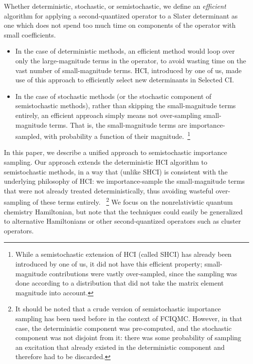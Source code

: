 \documentclass[english]{article}
\begin{document}
Whether deterministic, stochastic, or semistochastic, we define an \emph{efficient} algorithm for applying a second-quantized operator to a Slater determinant as one which does not spend too much time on components of the operator with small coefficients.
\begin{itemize}
\item In the case of deterministic methods, an efficient method would loop over only the large-magnitude terms in the operator, to avoid wasting time on the vast number of small-magnitude terms. HCI, introduced by one of us, made use of this approach to efficiently select new determinants in Selected CI.
\item In the case of stochastic methods (or the stochastic component of semistochastic methods), rather than skipping the small-magnitude terms entirely, an efficient approach simply means not over-sampling small-magnitude terms. That is, the small-magnitude terms are importance-sampled, with probability a function of their magnitude.~\footnote{While a semistochastic extension of HCI (called SHCI) has already been introduced by one of us, it did not have this efficient property; small-magnitude contributions were vastly over-sampled, since the sampling was done according to a distribution that did not take the matrix element magnitude into account.}
\end{itemize}

In this paper, we describe a unified approach to semistochastic importance sampling. Our approach extends the deterministic HCI algorithm to semistochastic methods, in a way that (unlike SHCI) is consistent with the underlying philosophy of HCI: we importance-sample the small-magnitude terms that were not already treated deterministically, thus avoiding wasteful over-sampling of these terms entirely. ~\footnote{It should be noted that a crude version of semistochastic importance sampling has been used before in the context of FCIQMC. However, in that case, the deterministic component was pre-computed, and the stochastic component was not disjoint from it: there was some probability of sampling an excitation that already existed in the deterministic component and therefore had to be discarded.}
We focus on the nonrelativistic quantum chemistry Hamiltonian, but note that the techniques could easily be generalized to alternative Hamiltonians or other second-quantized operators such as cluster operators.
\end{document}
